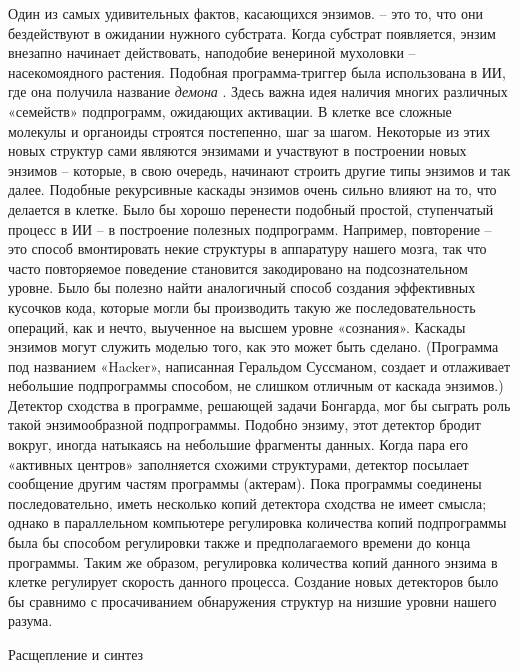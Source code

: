 \documentclass[../main.tex]{subfiles}
\begin{document}
Один из самых удивительных фактов, касающихся энзимов. \--- это то, что они бездействуют в ожидании нужного субстрата. Когда субстрат появляется, энзим внезапно начинает действовать, наподобие венериной мухоловки \--- насекомоядного растения. Подобная программа-триггер была использована в ИИ, где она получила название \emph{демона} . Здесь важна идея наличия многих различных «семейств» подпрограмм, ожидающих активации. В клетке все сложные молекулы и органоиды строятся постепенно, шаг за шагом. Некоторые из этих новых структур сами являются энзимами и участвуют в построении новых энзимов \--- которые, в свою очередь, начинают строить другие типы энзимов и так далее. Подобные рекурсивные каскады энзимов очень сильно влияют на то, что делается в клетке. Было бы хорошо перенести подобный простой, ступенчатый процесс в ИИ \--- в построение полезных подпрограмм. Например, повторение \--- это способ вмонтировать некие структуры в аппаратуру нашего мозга, так что часто повторяемое поведение становится закодировано на подсознательном уровне. Было бы полезно найти аналогичный способ создания эффективных кусочков кода, которые могли бы производить такую же последовательность операций, как и нечто, выученное на высшем уровне «сознания». Каскады энзимов могут служить моделью того, как это может быть сделано. (Программа под названием «Hacker», написанная Геральдом Суссманом, создает и отлаживает небольшие подпрограммы способом, не слишком отличным от каскада энзимов.) Детектор сходства в программе, решающей задачи Бонгарда, мог бы сыграть роль такой энзимообразной подпрограммы. Подобно энзиму, этот детектор бродит вокруг, иногда натыкаясь на небольшие фрагменты данных. Когда пара его «активных центров» заполняется схожими структурами, детектор посылает сообщение другим частям программы (актерам). Пока программы соединены последовательно, иметь несколько копий детектора сходства не имеет смысла; однако в параллельном компьютере регулировка количества копий подпрограммы была бы способом регулировки также и предполагаемого времени до конца программы. Таким же образом, регулировка количества копий данного энзима в клетке регулирует скорость данного процесса. Создание новых детекторов было бы сравнимо с просачиванием обнаружения структур на низшие уровни нашего разума.

Расщепление и синтез
\end{document}
